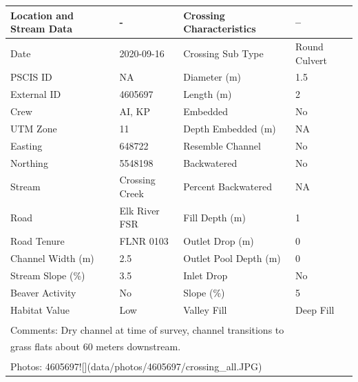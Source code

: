 \documentclass[
]{book}
\begin{document}
\begin{tabular}{llll}
\toprule
Location and Stream Data & - & Crossing Characteristics & --\\
\midrule
Date & 2020-09-16 & Crossing Sub Type & Round Culvert\\
PSCIS ID & NA & Diameter (m) & 1.5\\
External ID & 4605697 & Length (m) & 2\\
Crew & AI, KP & Embedded & No\\
UTM Zone & 11 & Depth Embedded (m) & NA\\
\addlinespace
Easting & 648722 & Resemble Channel & No\\
Northing & 5548198 & Backwatered & No\\
Stream & Crossing Creek & Percent Backwatered & NA\\
Road & Elk River FSR & Fill Depth (m) & 1\\
Road Tenure & FLNR 0103 & Outlet Drop (m) & 0\\
\addlinespace
Channel Width (m) & 2.5 & Outlet Pool Depth (m) & 0\\
Stream Slope (\%) & 3.5 & Inlet Drop & No\\
Beaver Activity & No & Slope (\%) & 5\\
Habitat Value & Low & Valley Fill & Deep Fill\\
\bottomrule
\multicolumn{4}{l}{\textsuperscript{} Comments: Dry channel at time of survey, channel transitions to}\\
\multicolumn{4}{l}{grass flats about 60 meters downstream.}\\
\multicolumn{4}{l}{\textsuperscript{} Photos: 4605697![](data/photos/4605697/crossing\_all.JPG)}\\
\end{tabular}
\end{document}
